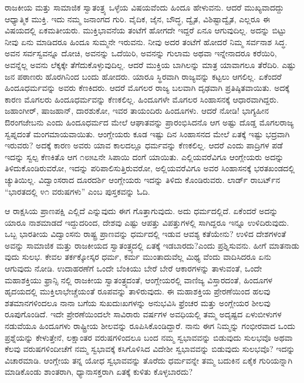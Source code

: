 ರಾಜಕೀಯ ಮತ್ತು ಸಾಮಾಜಿಕ ಸ್ವಾತಂತ್ರ್ಯ ಒಳ್ಳೆಯ ವಿಷಯವೆಂದು ಹಿಂದೂ ಹೇಳುವನು. ಆದರೆ ಮುಖ್ಯವಾದದ್ದು ಆಧ್ಯಾತ್ಮಿಕ ಮುಕ್ತಿ. ಇದು ನಮ್ಮ ಜನಾಂಗದ ಗುರಿ. ವೈದಿಕ, ಜೈನ, ಬೌದ್ಧ, ದ್ವೈತ, ವಿಶಿಷ್ಟಾದ್ವೈತ, ಎಲ್ಲರೂ ಈ ವಿಷಯದಲ್ಲಿ ಏಕಮತೀಯರು. ಮುಕ್ತಿಭಾವನೆಯ ತಂಟೆಗೆ ಹೋಗದೇ ಇದ್ದರೆ ಏನೂ ಆಗುವುದಿಲ್ಲ. ಅದನ್ನು ಬಿಟ್ಟು ನೀವು ಏನು ಮಾಡಿದರೂ ಹಿಂದೂ ಸುಮ್ಮನೇ ಇರುವನು. ನೀವು ಅದರ ತಂಟೆಗೆ ಹೋದರೆ ನಿಮ್ಮ ಸರ್ವನಾಶ ಸಿದ್ಧ. ಅವನ ಸರ್ವಸ್ವವನ್ನೂ ದೋಚಿ, ಅವನನ್ನು ಒದೆಯಿರಿ, ಅವನನ್ನು ಗುಲಾಮ ಅಥವಾ ಇನ್ನೇನಾದರೂ ಕರೆಯಿರಿ, ಅವನ್ನೆಲ್ಲ ಅವನು ಲೆಕ್ಕಕ್ಕೇ ತೆಗೆದುಕೊಳ್ಳುವುದಿಲ್ಲ. ಆದರೆ ಮುಕ್ತಿಯ ಬಾಗಿಲನ್ನು ಮಾತ್ರ ಯಾವಾಗಲೂ ತೆರೆದಿರಿ. ಎಷ್ಟು ಜನ ಪಠಾಣರು ಹೊರಗಿನಿಂದ ಬಂದು ಹೋದರು. ಯಾರೂ ಸ್ಥಿರವಾಗಿ ರಾಜ್ಯವನ್ನು ಕಟ್ಟಲು ಆಗಲಿಲ್ಲ. ಏಕೆಂದರೆ ಹಿಂದೂಧರ್ಮವನ್ನು ಅವರು ಕೆಣಕಿದರು. ಆದರೆ ಮೊಗಲರ ರಾಜ್ಯ ಬಲವಾಗಿ ದೃಢವಾಗಿ ಪ್ರತಿಷ್ಠಿತವಾಯಿತು. ಅದಕ್ಕೆ ಕಾರಣ ಮೊಗಲರು ಹಿಂದೂಧರ್ಮವನ್ನು ಕೆಣಕಲಿಲ್ಲ. ಹಿಂದೂಗಳೇ ಮೊಗಲರ ಸಿಂಹಾಸನಕ್ಕೆ ಆಧಾರವಾಗಿದ್ದರು. ಜಹಾಂಗೀರ್​, ಷಾಜಹಾನ್​, ದಾರಶುಕೋ, ಇವರ ತಾಯಂದಿರು ಹಿಂದೂಗಳು. ಆದರೆ ನೋಡಿ! ಭಾಗ್ಯಹೀನ ಔರಂಗಜೇಬನು ಎಂದು ಹಿಂದೂಧರ್ಮದ ಮೇಲೆ ಆಘಾತವನ್ನು ಪ್ರಾರಂಭಿಸಿದನೊ ಆಗ ಅಷ್ಟು ದೊಡ್ಡ ಮೊಗಲರಾಜ್ಯ ಸ್ವಪ್ನದಂತೆ ಮಂಗಮಾಯವಾಯಿತು. ಆಂಗ್ಲೇಯರು ಕೂಡ ಇಷ್ಟು ದಿನ ಸಿಂಹಾಸನದ ಮೇಲೆ ಏತಕ್ಕೆ ಇಷ್ಟು ಭದ್ರವಾಗಿ ಇರುವರು? ಅದಕ್ಕೆ ಕಾರಣ ಅವರು ಯಾವ ಕಾಲದಲ್ಲೂ ಧರ್ಮವನ್ನು ಕೆಣಕಲಿಲ್ಲ. ಆದರೆ ಎಂದು ಪಾದ್ರಿಗಳ ಪಡೆ ಇದನ್ನು ಸ್ವಲ್ಪ ಕೆಣಕಿತೊ ಆಗ ೧೮೫೭ನೇ ಸಿಪಾಯಿ ದಂಗೆ ಯಾಯಿತು. ಎಲ್ಲಿಯವರೆವಿಗೂ ಆಂಗ್ಲೇಯರು ಅದನ್ನು ತಿಳಿದುಕೊಂಡಿರುವರೋ, ಇದನ್ನು ಪರಿಪಾಲಿಸುತ್ತಿರುವರೋ, ಅಲ್ಲಿಯವರೆವಿಗೂ ಅವರ ಸಿಂಹಾಸನಕ್ಕೆ ಭರತಖಂಡದಲ್ಲಿ ಚ್ಯುತಿಯಿಲ್ಲ. ವಿದ್ವಾಂಸರಾದ ದೂರದರ್ಶಿ ಆಂಗ್ಲೇಯರು ಇದನ್ನು ತಿಳಿದು ಕೊಂಡಿರುವರು. ಲಾರ್ಡ್​ ರಾಬರ್ಟ್​ನ “ಭಾರತದಲ್ಲಿ ೪೧ ವರುಷಗಳು” ಎಂಬ ಪುಸ್ತಕವನ್ನು ಓದಿ.

ಆ ರಾಕ್ಷಸಿಯ ಪ್ರಾಣಪಕ್ಷಿ ಎಲ್ಲಿದೆ ಎನ್ನುವುದು ಈಗ ಗೊತ್ತಾಗುವುದು. ಅದು ಧರ್ಮದಲ್ಲಿದೆ. ಏಕೆಂದರೆ ಅದನ್ನು ಯಾರೂ ನಾಶಮಾಡದೆ ಇದ್ದುದರಿಂದ, ದೇಶವು ಎಷ್ಟು ಆಪತ್ತು ವಿಪತ್ತುಗಳಲ್ಲಿ ಸಾಗಿದ್ದರೂ ಇನ್ನೂ ಉಳಿದಿರುವುದು. ಒಬ್ಬ ಭಾರತೀಯ ವಿದ್ವಾಂಸನು ರಾಷ್ಟ್ರ ಪ್ರಾಣವನ್ನು ಧರ್ಮದಲ್ಲಿ ಇಡುವ ಆವಶ್ಯ ಕತೆಯೇನು? ಉಳಿದ ದೇಶಗಳಂತೆ ಅವನ್ನು ಸಾಮಾಜಿಕ ಮತ್ತು ರಾಜಕೀಯದ ಸ್ವಾತಂತ್ರ್ಯದಲ್ಲಿ ಏತಕ್ಕೆ ಇಡಬಾರದು?ಎಂದು ಪ್ರಶ್ನಿಸುವನು. ಹೀಗೆ ಮಾತನಾಡು ವುದು ಸುಲಭ. ಕೇವಲ ತರ್ಕಕ್ಕೋಸ್ಕರ ಧರ್ಮ, ಕರ್ಮ ಮುಂತಾದುವೆಲ್ಲ ಮಿಥ್ಯ ವೆಂದು ವಾದಿಸಿದರೂ ಏನು ಆಗುವುದು ನೋಡಿ. ಉದಾಹರಣೆಗೆ ಒಂದೇ ಬೆಂಕಿಯು ಬೇರೆ ಬೇರೆ ಆಕಾರಗಳನ್ನು ತಾಳುವಂತೆ, ಒಂದೇ ಮಹಾಶಕ್ತಿಯು ಫ್ರಾನ್ಸಿ ನಲ್ಲಿ ರಾಜಕೀಯ ಸ್ವಾತಂತ್ರ್ಯದಂತೆ, ಆಂಗ್ಲೇಯರಲ್ಲಿ ವಾಣಿಜ್ಯ ವಿಸ್ತಾರದಂತೆ, ಹಿಂದೂಗಳ ಹೃದಯದಲ್ಲಿ ಮುಕ್ತಿಲಾಭೇಚ್ಚೆಯಂತೆ ರೂಪವನ್ನು ತಾಳಿರುವುದು. ಈ ಮಹಾಶಕ್ತಿಯ ಪ್ರೇರಣೆಯಿಂದ ಹಲವು ಶತಮಾನಗಳಿಂದಲೂ ನಾನಾ ಬಗೆಯ ಸುಖದುಃಖಗಳನ್ನು ಅನುಭವಿಸಿ ಫ್ರೆಂಚರ ಮತ್ತು ಅಂಗ್ಲೇಯರ ಶೀಲವು ರೂಪುಗೊಂಡಿದೆ. ಇದೇ ಪ್ರೇರಣೆಯಿಂದಲೇ ಸಾವಿರಾರು ವರ್ಷಗಳ ಅವಧಿಯಲ್ಲಿ ತಮ್ಮ ಅದೃಷ್ಟದ ಏಳುಬೀಳುಗಳ ನಡುವೆಯೂ ಹಿಂದೂಗಳು ರಾಷ್ಟ್ರೀಯ ಶೀಲವನ್ನು ರೂಪಿಸಿಕೊಂಡಿದ್ದಾರೆ. ನಾನು ಈಗ ನಿಮ್ಮನ್ನು ಗಂಭೀರವಾದ ಒಂದು ಪ್ರಶ್ನೆಯನ್ನು ಕೇಳುತ್ತೇನೆ, ಲಕ್ಷಾಂತರ ವರುಷಗಳಿಂದಲೂ ಬಂದ ನಮ್ಮ ಸ್ವಭಾವವನ್ನು ಬಿಡುವುದು ಸುಲಭವೊ ಅಥವಾ ಕೆಲವು ವರುಷಗಳಿಂದೀಚೆಗೆ ನಮ್ಮ ಸ್ವಭಾವಕ್ಕೆ ಕಸಿಗೊಳಿಸಿದ ವಿದೇಶೀ ಸ್ವಭಾವವನ್ನು ಬಿಡುವುದು ಸುಲಭವೊ? ಇದನ್ನು ವಿಚಾರಮಾಡಿ. ಆಂಗ್ಲೇಯ ತನ್ನ ಯೋಧ ಸ್ವಭಾವವನ್ನು ತೊರೆದು ಧರ್ಮವನ್ನೇ ತಮ್ಮ ಬದುಕಿನ ಏಕೈಕ ಗುರಿಯನ್ನಾಗಿ ಮಾಡಿಕೊಂಡು ಶಾಂತರಾಗಿ, ಧ್ಯಾನಾಸಕ್ತರಾಗಿ ಏತಕ್ಕೆ ಕುಳಿತು ಕೊಳ್ಳಬಾರದು?

